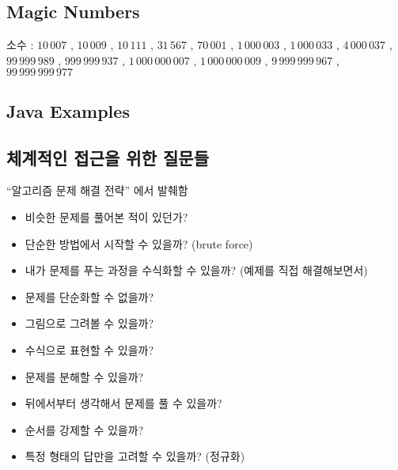 \documentclass[10pt,landscape,a4paper,twocolumn]{article}
\begin{document}
\subsection{Magic Numbers}

소수 : $10\,007$ , $10\,009$ , $10\,111$ , $31\,567$ , $70\,001$ , $1\,000\,003$ , $1\,000\,033$ , $4\,000\,037$ , $99\,999\,989$ , $999\,999\,937$ , $1\,000\,000\,007$ , $1\,000\,000\,009$ , $9\,999\,999\,967$ , $99\,999\,999\,977$



\subsection{Java Examples}



\subsection{체계적인 접근을 위한 질문들}

``알고리즘 문제 해결 전략'' 에서 발췌함
\begin{itemize}
\item 비슷한 문제를 풀어본 적이 있던가?
\item 단순한 방법에서 시작할 수 있을까? (brute force)
\item 내가 문제를 푸는 과정을 수식화할 수 있을까? (예제를 직접 해결해보면서)
\item 문제를 단순화할 수 없을까?
\item 그림으로 그려볼 수 있을까?
\item 수식으로 표현할 수 있을까?
\item 문제를 분해할 수 있을까?
\item 뒤에서부터 생각해서 문제를 풀 수 있을까?
\item 순서를 강제할 수 있을까?
\item 특정 형태의 답만을 고려할 수 있을까? (정규화)
\end{itemize}
\end{document}
